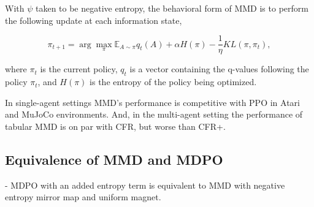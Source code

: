 With $\psi$ taken to be negative entropy, the behavioral form of MMD is to perform the following
update at each information state,

\begin{equation}
	\label{eqn:mmdbf} \pi_{t+1}
	= \arg \max_{\pi} \mathbb{E}_{A \sim \pi} q_t(A) + \alpha H(\pi) - \frac{1}{\eta} KL(\pi, \pi_t),
\end{equation}

where $\pi_t$ is the current policy, $q_t$ is a vector
containing the q-values following the policy $\pi_t$, and $H(\pi)$ is the entropy of the policy
being optimized.





In single-agent settings MMD's performance is competitive with PPO in Atari and MuJoCo
environments.
And, in the multi-agent setting the performance of tabular MMD is on par with CFR, but worse than
CFR+.

\subsection{Equivalence of MMD and MDPO}

- MDPO with an added entropy term is equivalent to MMD with negative entropy mirror map and
uniform magnet.